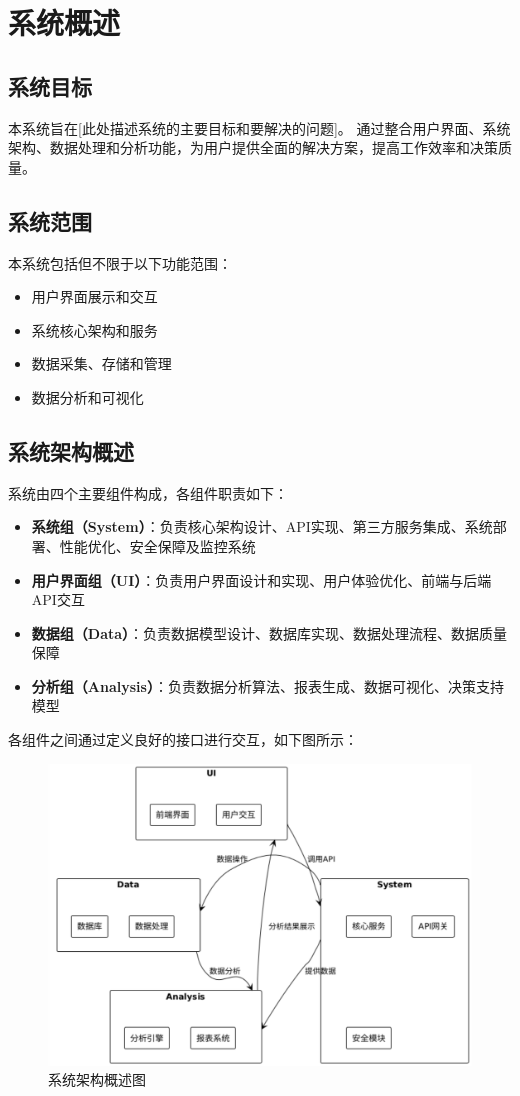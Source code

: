 \documentclass[a4paper,12pt]{article}
\begin{document}
\section{系统概述}

\subsection{系统目标}

本系统旨在[此处描述系统的主要目标和要解决的问题]。
通过整合用户界面、系统架构、数据处理和分析功能，为用户提供全面的解决方案，提高工作效率和决策质量。

\subsection{系统范围}

本系统包括但不限于以下功能范围：
\begin{itemize}
  \item 用户界面展示和交互
  \item 系统核心架构和服务
  \item 数据采集、存储和管理
  \item 数据分析和可视化
\end{itemize}

\subsection{系统架构概述}

系统由四个主要组件构成，各组件职责如下：

\begin{itemize}
  \item \textbf{系统组（System）}：负责核心架构设计、API实现、第三方服务集成、系统部署、性能优化、安全保障及监控系统
  \item \textbf{用户界面组（UI）}：负责用户界面设计和实现、用户体验优化、前端与后端API交互
  \item \textbf{数据组（Data）}：负责数据模型设计、数据库实现、数据处理流程、数据质量保障
  \item \textbf{分析组（Analysis）}：负责数据分析算法、报表生成、数据可视化、决策支持模型
\end{itemize}

各组件之间通过定义良好的接口进行交互，如下图所示：

\begin{figure}[H]
    \centering
    \includegraphics[width=0.75\linewidth]{assets/7.png}
    \caption{系统架构概述图}
    \label{fig:system-architecture}
\end{figure}
\end{document}
